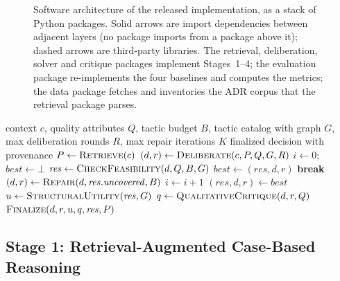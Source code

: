 \documentclass[preprint,12pt,authoryear]{elsarticle}
\renewcommand{\_}{\textunderscore\allowbreak{}}
\begin{document}
\begin{figure}[!htbp]
\centering
{}
\caption{Software architecture of the released implementation, as a stack of Python packages. Solid arrows are import dependencies between adjacent layers (no package imports from a package above it); dashed arrows are third-party libraries. The retrieval, deliberation, solver and critique packages implement Stages~1--4; the evaluation package re-implements the four baselines and computes the metrics; the data package fetches and inventories the ADR corpus that the retrieval package parses.\label{fig:implementation}}
\end{figure}
\FloatBarrier

\begin{algorithm}[t]
\caption{CADENCE}
\label{alg:cadence}
\begin{algorithmic}[1]
\REQUIRE context $c$, quality attributes $Q$, tactic budget $B$, tactic catalog with graph $G$, max deliberation rounds $R$, max repair iterations $K$
\ENSURE finalized decision with provenance
\STATE $P \gets \textsc{Retrieve}(c)$ 
\STATE $(d, r) \gets \textsc{Deliberate}(c, P, Q, G, R)$ 
\STATE $i \gets 0$; $\mathit{best} \gets \bot$
\LOOP
  \STATE $\mathit{res} \gets \textsc{CheckFeasibility}(d, Q, B, G)$ 
    \STATE $\mathit{best} \gets (\mathit{res}, d, r)$ 
  \ENDIF
    \STATE \textbf{break} 
  \ENDIF
  \STATE $(d, r) \gets \textsc{Repair}(d, \mathit{res}.\mathit{uncovered}, B)$ 
  \STATE $i \gets i + 1$
\ENDLOOP
\STATE $(\mathit{res}, d, r) \gets \mathit{best}$ 
\STATE $u \gets \textsc{StructuralUtility}(\mathit{res}, G)$ 
\STATE $q \gets \textsc{QualitativeCritique}(d, r, Q)$ 
\RETURN $\textsc{Finalize}(d, r, u, q, \mathit{res}, P)$
\end{algorithmic}
\end{algorithm}

\subsection{Stage 1: Retrieval-Augmented Case-Based Reasoning}
\end{document}
